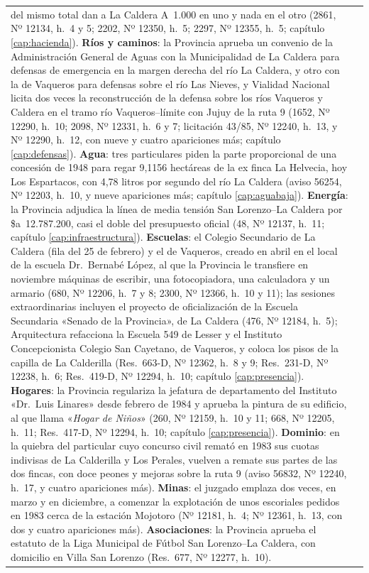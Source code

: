 \begin{longtable}{@{}p{2.7cm}p{10.3cm}@{}}
del mismo total dan a La Caldera A~1.000 en uno y nada en el otro (2861, Nº 12134, h.\ 4 y 5; 2202, Nº 12350, h.\ 5; 2297, Nº 12355, h.\ 5; capítulo \ref{cap:hacienda}). \textbf{Ríos y caminos}: la Provincia aprueba un convenio de la Administración General de Aguas con la Municipalidad de La Caldera para defensas de emergencia en la margen derecha del río La Caldera, y otro con la de Vaqueros para defensas sobre el río Las Nieves, y Vialidad Nacional licita dos veces la reconstrucción de la defensa sobre los ríos Vaqueros y Caldera en el tramo río Vaqueros--límite con Jujuy de la ruta 9 (1652, Nº 12290, h.\ 10; 2098, Nº 12331, h.\ 6 y 7; licitación 43/85, Nº 12240, h.\ 13, y Nº 12290, h.\ 12, con nueve y cuatro apariciones más; capítulo \ref{cap:defensas}). \textbf{Agua}: tres particulares piden la parte proporcional de una concesión de 1948 para regar 9,1156 hectáreas de la ex finca La Helvecia, hoy Los Espartacos, con 4,78 litros por segundo del río La Caldera (aviso 56254, Nº 12203, h.\ 10, y nueve apariciones más; capítulo \ref{cap:aguabaja}). \textbf{Energía}: la Provincia adjudica la línea de media tensión San Lorenzo--La Caldera por \$a~12.787.200, casi el doble del presupuesto oficial (48, Nº 12137, h.\ 11; capítulo \ref{cap:infraestructura}). \textbf{Escuelas}: el Colegio Secundario de La Caldera (fila del 25 de febrero) y el de Vaqueros, creado en abril en el local de la escuela Dr.\ Bernabé López, al que la Provincia le transfiere en noviembre máquinas de escribir, una fotocopiadora, una calculadora y un armario (680, Nº 12206, h.\ 7 y 8; 2300, Nº 12366, h.\ 10 y 11); las sesiones extraordinarias incluyen el proyecto de oficialización de la Escuela Secundaria «Senado de la Provincia», de La Caldera (476, Nº 12184, h.\ 5); Arquitectura refacciona la Escuela 549 de Lesser y el Instituto Concepcionista Colegio San Cayetano, de Vaqueros, y coloca los pisos de la capilla de La Calderilla (Res.\ 663-D, Nº 12362, h.\ 8 y 9; Res.\ 231-D, Nº 12238, h.\ 6; Res.\ 419-D, Nº 12294, h.\ 10; capítulo \ref{cap:presencia}). \textbf{Hogares}: la Provincia regulariza la jefatura de departamento del Instituto «Dr.\ Luis Linares» desde febrero de 1984 y aprueba la pintura de su edificio, al que llama «\textit{Hogar de Niños}» (260, Nº 12159, h.\ 10 y 11; 668, Nº 12205, h.\ 11; Res.\ 417-D, Nº 12294, h.\ 10; capítulo \ref{cap:presencia}). \textbf{Dominio}: en la quiebra del particular cuyo concurso civil remató en 1983 sus cuotas indivisas de La Calderilla y Los Perales, vuelven a remate sus partes de las dos fincas, con doce peones y mejoras sobre la ruta 9 (aviso 56832, Nº 12240, h.\ 17, y cuatro apariciones más). \textbf{Minas}: el juzgado emplaza dos veces, en marzo y en diciembre, a comenzar la explotación de unos escoriales pedidos en 1983 cerca de la estación Mojotoro (Nº 12181, h.\ 4; Nº 12361, h.\ 13, con dos y cuatro apariciones más). \textbf{Asociaciones}: la Provincia aprueba el estatuto de la Liga Municipal de Fútbol San Lorenzo--La Caldera, con domicilio en Villa San Lorenzo (Res.\ 677, Nº 12277, h.\ 10). \\

\end{longtable}
